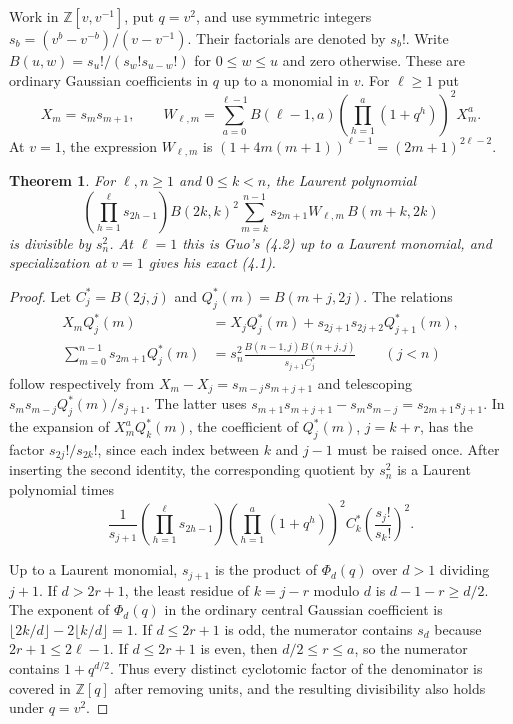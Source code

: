 \documentclass[11pt,a4paper]{article}
\newtheorem{theorem}{Theorem}[section]\newtheorem{lemma}[theorem]{Lemma}
\theoremstyle{definition}\newtheorem{problem}[theorem]{Auxiliary problem}
\theoremstyle{remark}\newtheorem*{remark}{Remark}
\begin{document}
Work in $\mathbb Z[v,v^{-1}]$, put $q=v^2$, and use symmetric integers
$s_b=(v^b-v^{-b})/(v-v^{-1})$. Their factorials are denoted by $s_b!$.
Write $B(u,w)=s_u!/(s_w!s_{u-w}!)$ for $0\le w\le u$ and zero otherwise.
These are ordinary Gaussian coefficients in $q$ up to a monomial in $v$.
For $\ell\ge1$ put
\[
 X_m=s_ms_{m+1},\qquad
 W_{\ell,m}=\sum_{a=0}^{\ell-1} B(\ell-1,a)
       \left(\prod_{h=1}^{a}(1+q^h)\right)^2 X_m^a .
\]
At $v=1$, the expression $W_{\ell,m}$ is
$(1+4m(m+1))^{\ell-1}=(2m+1)^{2\ell-2}$.

\begin{theorem}
For $\ell,n\ge1$ and $0\le k<n$, the Laurent polynomial
\[
 \left(\prod_{h=1}^{\ell}s_{2h-1}\right) B(2k,k)^2
     \sum_{m=k}^{n-1}s_{2m+1}W_{\ell,m}\,B(m+k,2k)
\]
is divisible by $s_n^2$. At $\ell=1$ this is Guo's (4.2) up to a
Laurent monomial, and specialization at $v=1$ gives his exact (4.1).
\end{theorem}
\begin{proof}
Let $C_j^*=B(2j,j)$ and $Q_j^*(m)=B(m+j,2j)$. The relations
\begin{align*}
 X_mQ_j^*(m)&=X_jQ_j^*(m)+s_{2j+1}s_{2j+2}Q_{j+1}^*(m),\\
 \sum_{m=0}^{n-1}s_{2m+1}Q_j^*(m)
 &=s_n^2\frac{B(n-1,j)B(n+j,j)}{s_{j+1}C_j^*}\qquad(j<n)
\end{align*}
follow respectively from $X_m-X_j=s_{m-j}s_{m+j+1}$ and telescoping
$s_m s_{m-j}Q_j^*(m)/s_{j+1}$. The latter uses
$s_{m+1}s_{m+j+1}-s_ms_{m-j}=s_{2m+1}s_{j+1}$.
In the expansion of $X_m^aQ_k^*(m)$, the coefficient of $Q_j^*(m)$,
$j=k+r$, has the factor $s_{2j}!/s_{2k}!$, since each index between
$k$ and $j-1$ must be raised once. After inserting the second identity,
the corresponding quotient by $s_n^2$ is a Laurent polynomial times
\[
 \frac{1}{s_{j+1}}
 \left(\prod_{h=1}^{\ell}s_{2h-1}\right)
 \left(\prod_{h=1}^{a}(1+q^h)\right)^2
 C_k^* \left(\frac{s_j!}{s_k!}\right)^2 .
\]

Up to a Laurent monomial, $s_{j+1}$ is the product of $\Phi_d(q)$
over $d>1$ dividing $j+1$. If $d>2r+1$, the least residue of
$k=j-r$ modulo $d$ is $d-1-r\ge d/2$. The exponent of $\Phi_d(q)$ in
the ordinary central Gaussian coefficient is
$\lfloor2k/d\rfloor-2\lfloor k/d\rfloor=1$.
If $d\le2r+1$ is odd, the numerator contains $s_d$ because
$2r+1\le2\ell-1$. If $d\le2r+1$ is even, then
$d/2\le r\le a$, so the numerator contains $1+q^{d/2}$.
Thus every distinct cyclotomic factor of the denominator is covered in
$\mathbb Z[q]$ after removing units, and the resulting divisibility also
holds under $q=v^2$.
\end{proof}
\end{document}
